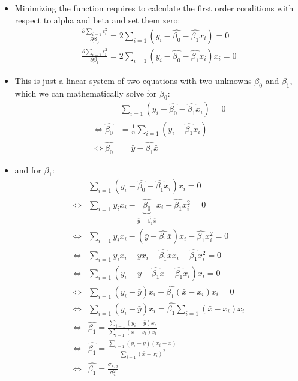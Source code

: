 \documentclass[
]{article}
\providecommand{\tightlist}{%
  \setlength{\itemsep}{0pt}\setlength{\parskip}{0pt}}
\begin{document}
\begin{itemize}
\tightlist
\item
  Minimizing the function requires to calculate the first order
  conditions with respect to alpha and beta and set them zero:
  \begin{align*}
  \frac{\partial \sum_{i=1} \epsilon_i^2}{\partial \beta_{0}}=2 \sum_{i=1}    (y_i - \hat{\beta_{0}} - \hat{\beta_{1}} x_i)=0\\
  \frac{\partial \sum_{i=1} \epsilon_i^2}{\partial \beta_{1}}=2 \sum_{i=1}    (y_i - \hat{\beta_{0}} - \hat{\beta_{1}} x_i)x_i=0
  \end{align*}
\item
  This is just a linear system of two equations with two unknowns
  \(\beta_{0}\) and \(\beta_{1}\), which we can mathematically solve for
  \(\beta_0\): \begin{align*}
   &\sum_{i=1} (y_i - \hat{\beta_{0}} - \hat{\beta_{1}} x_i)=0\\
   \Leftrightarrow \hat{\beta_{0}}&=\frac{1}{n}\sum_{i=1}  (y_i  - \hat{\beta_{1}} x_i)\\
   \Leftrightarrow \hat{\beta_{0}}&=\bar{y}-\hat{\beta_{1}}\bar{x}
  \end{align*}
\item
  and for \(\beta_{1}\): \begin{align*}
   &\sum_{i=1} (y_i - \hat{\beta_{0}} - \hat{\beta_{1}} x_i)x_i=0\\
   \Leftrightarrow & \sum_{i=1}    y_i x_i- \underbrace{\hat{\beta_{0}}}_{\bar{y}-\hat{\beta_{1}}\bar{x}}x_i - \hat{\beta_{1}} x_i^2=0\\
   \Leftrightarrow & \sum_{i=1}    y_i x_i- (\bar{y}-\hat{\beta_{1}}\bar{x})x_i - \hat{\beta_{1}} x_i^2=0\\    
   \Leftrightarrow & \sum_{i=1}    y_i x_i- \bar{y}x_i-\hat{\beta_{1}}\bar{x}x_i - \hat{\beta_{1}} x_i^2=0\\   
   \Leftrightarrow & \sum_{i=1}    (y_i - \bar{y}-\hat{\beta_{1}}\bar{x} - \hat{\beta_{1}} x_i)x_i=0\\ 
   \Leftrightarrow & \sum_{i=1} (y_i - \bar{y}) x_i -\hat{\beta_{1}}(\bar{x} -  x_i)x_i =0\\
   \Leftrightarrow & \sum_{i=1}    (y_i - \bar{y}) x_i  =  \hat{\beta_{1}} \sum_{i=1} (\bar{x} -  x_i) x_i \\
   \Leftrightarrow & \hat{\beta_{1}} =\frac{\sum_{i=1}(y_i - \bar{y})x_i }{ \sum_{i=1} (\bar{x} -  x_i)x_i }\\
   \Leftrightarrow & \hat{\beta_{1}} =\frac{\sum_{i=1}(y_i -\bar{y})(x_i-\bar{x})}{\sum_{i=1} (\bar{x} -  x_i)^2 }\\
   \Leftrightarrow & \hat{\beta_{1}} ={\frac {\sigma_{x,y}}{\sigma^2_{x}}}
  \end{align*}
\end{itemize}
\end{document}
